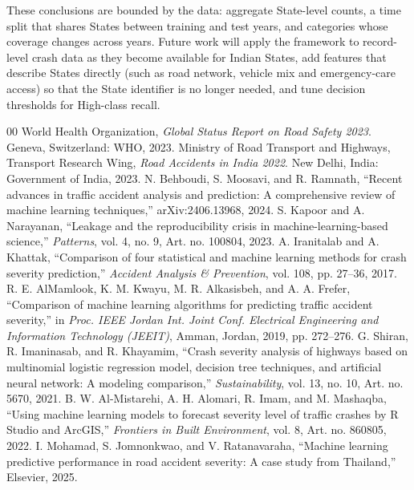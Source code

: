 \documentclass[conference]{IEEEtran}
\begin{document}
These conclusions are bounded by the data: aggregate State-level counts, a time split that shares States between training and test years, and categories whose coverage changes across years. Future work will apply the framework to record-level crash data as they become available for Indian States, add features that describe States directly (such as road network, vehicle mix and emergency-care access) so that the State identifier is no longer needed, and tune decision thresholds for High-class recall.

\begin{thebibliography}{00}
 World Health Organization, \emph{Global Status Report on Road Safety 2023}. Geneva, Switzerland: WHO, 2023.
 Ministry of Road Transport and Highways, Transport Research Wing, \emph{Road Accidents in India 2022}. New Delhi, India: Government of India, 2023.
 N. Behboudi, S. Moosavi, and R. Ramnath, ``Recent advances in traffic accident analysis and prediction: A comprehensive review of machine learning techniques,'' arXiv:2406.13968, 2024.
 S. Kapoor and A. Narayanan, ``Leakage and the reproducibility crisis in machine-learning-based science,'' \emph{Patterns}, vol. 4, no. 9, Art. no. 100804, 2023.
 A. Iranitalab and A. Khattak, ``Comparison of four statistical and machine learning methods for crash severity prediction,'' \emph{Accident Analysis \& Prevention}, vol. 108, pp. 27--36, 2017.
 R. E. AlMamlook, K. M. Kwayu, M. R. Alkasisbeh, and A. A. Frefer, ``Comparison of machine learning algorithms for predicting traffic accident severity,'' in \emph{Proc. IEEE Jordan Int. Joint Conf. Electrical Engineering and Information Technology (JEEIT)}, Amman, Jordan, 2019, pp. 272--276.
 G. Shiran, R. Imaninasab, and R. Khayamim, ``Crash severity analysis of highways based on multinomial logistic regression model, decision tree techniques, and artificial neural network: A modeling comparison,'' \emph{Sustainability}, vol. 13, no. 10, Art. no. 5670, 2021.
 B. W. Al-Mistarehi, A. H. Alomari, R. Imam, and M. Mashaqba, ``Using machine learning models to forecast severity level of traffic crashes by R Studio and ArcGIS,'' \emph{Frontiers in Built Environment}, vol. 8, Art. no. 860805, 2022.
 I. Mohamad, S. Jomnonkwao, and V. Ratanavaraha, ``Machine learning predictive performance in road accident severity: A case study from Thailand,'' Elsevier, 2025.

\end{thebibliography}
\end{document}
